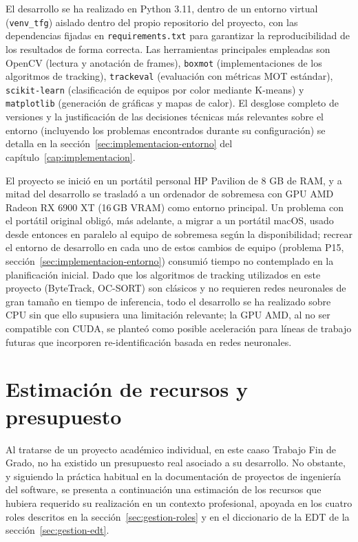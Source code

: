 El desarrollo se ha realizado en Python 3.11, dentro de un entorno virtual
(\texttt{venv\_tfg}) aislado dentro del propio repositorio del proyecto, con
las dependencias fijadas en \texttt{requirements.txt} para garantizar la
reproducibilidad de los resultados de forma correcta. Las herramientas principales empleadas
son OpenCV (lectura y anotación de frames), \texttt{boxmot} (implementaciones
de los algoritmos de tracking), \texttt{trackeval} (evaluación con métricas
MOT estándar), \texttt{scikit-learn} (clasificación de equipos por color
mediante K-means) y \texttt{matplotlib} (generación de gráficas y mapas de
calor). El desglose completo de versiones y la justificación de las
decisiones técnicas más relevantes sobre el entorno (incluyendo los
problemas encontrados durante su configuración) se detalla en la
sección~\ref{sec:implementacion-entorno} del capítulo~\ref{cap:implementacion}.

El proyecto se inició en un portátil personal HP Pavilion de 8 GB de RAM, y a
mitad del desarrollo se trasladó a un ordenador de sobremesa con GPU AMD
Radeon RX 6900 XT (16\,GB VRAM) como entorno principal. Un problema con el
portátil original obligó, más adelante, a migrar a un portátil macOS,
usado desde entonces en paralelo al equipo de sobremesa según la
disponibilidad; recrear el entorno de desarrollo en cada uno de estos
cambios de equipo (problema P15, sección~\ref{sec:implementacion-entorno})
consumió tiempo no contemplado en la planificación inicial. Dado que
los algoritmos de tracking utilizados en este proyecto (ByteTrack, OC-SORT)
son clásicos y no requieren redes neuronales de gran tamaño en tiempo de
inferencia, todo el desarrollo se ha realizado sobre CPU sin que ello
supusiera una limitación relevante; la GPU AMD, al no ser compatible con
CUDA, se planteó como posible aceleración para líneas de trabajo futuras que
incorporen re-identificación basada en redes neuronales.

\section{Estimación de recursos y presupuesto}
\label{sec:gestion-presupuesto}

Al tratarse de un proyecto académico individual, en este caaso Trabajo Fin de Grado, no ha existido un
presupuesto real asociado a su desarrollo. No obstante, y siguiendo la práctica habitual en
la documentación de proyectos de ingeniería del software, se presenta a continuación una estimación de
los recursos que hubiera requerido su realización en un contexto
profesional, apoyada en los cuatro roles descritos en la
sección~\ref{sec:gestion-roles} y en el diccionario de la EDT de la
sección~\ref{sec:gestion-edt}.

